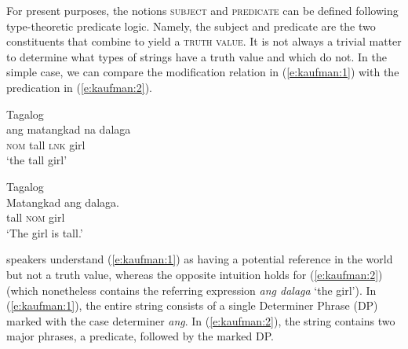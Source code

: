 \documentclass[output=paper]{langsci/langscibook}
\begin{document}
For present purposes, the notions \textsc{subject} and \textsc{predicate} can be defined following type-theoretic predicate logic. Namely, the subject and predicate are the two constituents that combine to yield a \textsc{truth value}. It is not always a trivial matter to determine what types of strings have a truth value and which do not. In the simple case, we can compare the modification relation in (\ref{e:kaufman:1}) with the predication in (\ref{e:kaufman:2}).

\begin{exe}
	\ex\label{e:kaufman:1}{Tagalog}\\
	\gll ang matangkad na dalaga\\
	\textsc{nom} tall \textsc{lnk} girl\\
	\glt `the tall girl'
\end{exe}

\begin{exe}
	\ex\label{e:kaufman:2}{Tagalog}\\
	\gll Matangkad ang dalaga.\\
	tall \textsc{nom} girl\\
	\glt `The girl is tall.'
\end{exe}

\noindent
{} speakers understand (\ref{e:kaufman:1}) as having a potential reference in the world but not a truth value, whereas the opposite intuition holds for (\ref{e:kaufman:2}) (which nonetheless contains the referring expression \textit{ang dalaga} `the girl'). In (\ref{e:kaufman:1}), the entire string consists of a single Determiner Phrase (DP) marked with the  case determiner \textit{ang}. In (\ref{e:kaufman:2}), the string contains two major phrases, a predicate, followed by the  marked DP.
\end{document}

